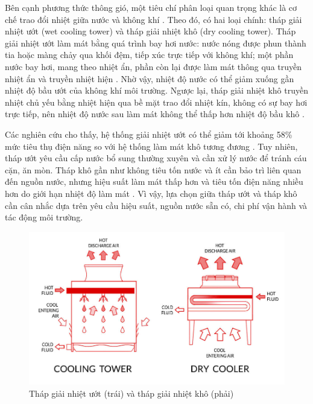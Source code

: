 \documentclass[../main.tex]{subfiles}
\begin{document}
Bên cạnh phương thức thông gió, một tiêu chí phân loại quan trọng khác là cơ chế trao đổi nhiệt giữa nước và không khí \cite{marriott_practical_thermal_2009}. Theo đó, có hai loại chính: tháp giải nhiệt ướt (wet cooling tower) và tháp giải nhiệt khô (dry cooling tower). Tháp giải nhiệt ướt làm mát bằng quá trình bay hơi nước: nước nóng được phun thành tia hoặc màng chảy qua khối đệm, tiếp xúc trực tiếp với không khí; một phần nước bay hơi, mang theo nhiệt ẩn, phần còn lại được làm mát thông qua truyền nhiệt ẩn và truyền nhiệt hiện \cite{marriott_practical_thermal_2009}. Nhờ vậy, nhiệt độ nước có thể giảm xuống gần nhiệt độ bầu ướt của không khí môi trường. Ngược lại, tháp giải nhiệt khô truyền nhiệt chủ yếu bằng nhiệt hiện qua bề mặt trao đổi nhiệt kín, không có sự bay hơi trực tiếp, nên nhiệt độ nước sau làm mát không thể thấp hơn nhiệt độ bầu khô \cite{marriott_practical_thermal_2009}. 

Các nghiên cứu cho thấy, hệ thống giải nhiệt ướt có thể giảm tới khoảng 58\% mức tiêu thụ điện năng so với hệ thống làm mát khô tương đương \cite{ahlborn_energy_saving_2014}. Tuy nhiên, tháp ướt yêu cầu cấp nước bổ sung thường xuyên và cần xử lý nước để tránh cáu cặn, ăn mòn. Tháp khô gần như không tiêu tốn nước và ít cần bảo trì liên quan đến nguồn nước, nhưng hiệu suất làm mát thấp hơn và tiêu tốn điện năng nhiều hơn do giới hạn nhiệt độ làm mát \cite{epa_cooling_tower_guide_2017}. Vì vậy, lựa chọn giữa tháp ướt và tháp khô cần cân nhắc dựa trên yêu cầu hiệu suất, nguồn nước sẵn có, chi phí vận hành và tác động môi trường.

\begin{figure}
    \centering
    \includegraphics[width=1\textwidth]{Hinhve/dry-cooler-vs-cooling-tower.jpg}
    \caption{Tháp giải nhiệt ướt (trái) và tháp giải nhiệt khô (phải) \cite{inpart24_dry_cooler}}
    \label{fig:doi_luu_dong_ngang}
\end{figure}
\end{document}
